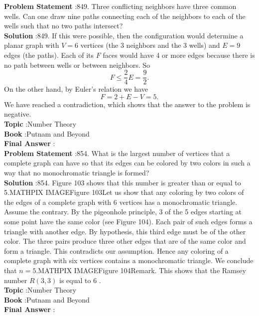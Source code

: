 \documentclass[10pt]{article}
\begin{document}
\textbf{Problem Statement} :849. Three conflicting neighbors have three common wells. Can one draw nine paths connecting each of the neighbors to each of the wells such that no two paths intersect?\\
\textbf{Solution} :849. If this were possible, then the configuration would determine a planar graph with $V=6$ vertices (the 3 neighbors and the 3 wells) and $E=9$ edges (the paths). Each of its $F$ faces would have 4 or more edges because there is no path between wells or between neighbors. So$$ F \leq \frac{2}{4} E=\frac{9}{2} . $$On the other hand, by Euler's relation we have $$ F=2+E-V=5 . $$We have reached a contradiction, which shows that the answer to the problem is negative. \\
\textbf{Topic} :Number Theory\\
\textbf{Book} :Putnam and Beyond\\
\textbf{Final Answer} :\\


\textbf{Problem Statement} :854. What is the largest number of vertices that a complete graph can have so that its edges can be colored by two colors in such a way that no monochromatic triangle is formed?\\
\textbf{Solution} :854. Figure 103 shows that this number is greater than or equal to 5.MATHPIX IMAGEFigure 103Let us show that any coloring by two colors of the edges of a complete graph with 6 vertices has a monochromatic triangle. Assume the contrary. By the pigeonhole principle, 3 of the 5 edges starting at some point have the same color (see Figure 104). Each pair of such edges forms a triangle with another edge. By hypothesis, this third edge must be of the other color. The three pairs produce three other edges that are of the same color and form a triangle. This contradicts our assumption. Hence any coloring of a complete graph with six vertices contains a monochromatic triangle. We conclude that $n=5$.MATHPIX IMAGEFigure 104Remark. This shows that the Ramsey number $R(3,3)$ is equal to 6 .\\
\textbf{Topic} :Number Theory\\
\textbf{Book} :Putnam and Beyond\\
\textbf{Final Answer} :\\
\end{document}
